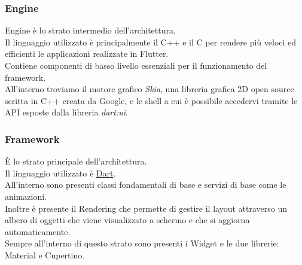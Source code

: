 \subsubsection{Engine}
Engine è lo strato intermedio dell'architettura.\\
Il linguaggio utilizzato è principalmente il C++ e il C per rendere più veloci ed efficienti le applicazioni realizzate in Flutter.\\
Contiene componenti di basso livello essenziali per il funzionamento del framework.\\
All'interno troviamo il motore grafico \textit{Skia}, una libreria grafica 2D open source scritta in C++ creata da Google, e le shell a cui è possibile accedervi tramite le API esposte dalla libreria \textit{dart:ui}.

\subsubsection{Framework}
È lo strato principale dell'architettura.\\
Il linguaggio utilizzato è \hyperref[sec:Dart]{Dart}.\\
All'interno sono presenti classi fondamentali di base e servizi di base come le animazioni.\\
Inoltre è presente il Rendering che permette di gestire il layout attraverso un albero di oggetti che viene visualizzato
a schermo e che si aggiorna automaticamente.\\
Sempre all'interno di questo strato sono presenti i Widget e le due librerie: Material e Cupertino.

\newpage

